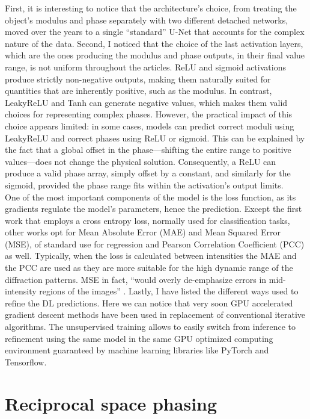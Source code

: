 First, it is interesting to notice that the architecture's choice, from treating the object's modulus and phase separately 
with two different detached networks, moved over the years to a single ``standard'' U-Net that accounts for the complex 
nature of the data. Second, I noticed that the choice of the last activation layers, which are the ones producing the 
modulus and phase outputs, in their final value range, is not uniform throughout the articles. ReLU and sigmoid activations 
produce strictly non-negative outputs, making them naturally suited for quantities that are inherently positive, such 
as the modulus. In contrast, LeakyReLU and Tanh can generate negative values, which makes them valid choices for 
representing complex phases. However, the practical impact of this choice appears limited: in some cases, models can 
predict correct moduli using LeakyReLU and correct phases using ReLU or sigmoid. This can be explained by the fact 
that a global offset in the phase—shifting the entire range to positive values—does not change the physical solution. 
Consequently, a ReLU can produce a valid phase array, simply offset by a constant, and similarly for the sigmoid, 
provided the phase range fits within the activation's output limits. 
\\
One of the most important components of the model is the loss function, as its gradients regulate the model's 
parameters, hence the prediction. Except the first work that employs a cross entropy loss, normally 
used for classification tasks, other works opt for Mean Absolute Error (MAE) and Mean Squared Error (MSE), of standard 
use for regression and Pearson Correlation Coefficient (PCC) as well. Typically, 
when the loss is calculated between intensities the MAE and the PCC are used as they are more suitable for the high dynamic 
range of the diffraction patterns. MSE in fact, ``would overly de-emphasize errors in mid-intensity regions of the images''
\cite{chan_rapid_2021}.
Lastly, I have listed the different ways used to refine the DL predictions. Here we can notice that very soon GPU accelerated
gradient descent methods have been used in replacement of conventional iterative algorithms. The unsupervised training
allows to easily switch from inference to refinement using the same model in the same GPU optimized 
computing environment guaranteed by machine learning libraries like PyTorch and Tensorflow. 

\section{Reciprocal space phasing}\label{chp:phasing}


